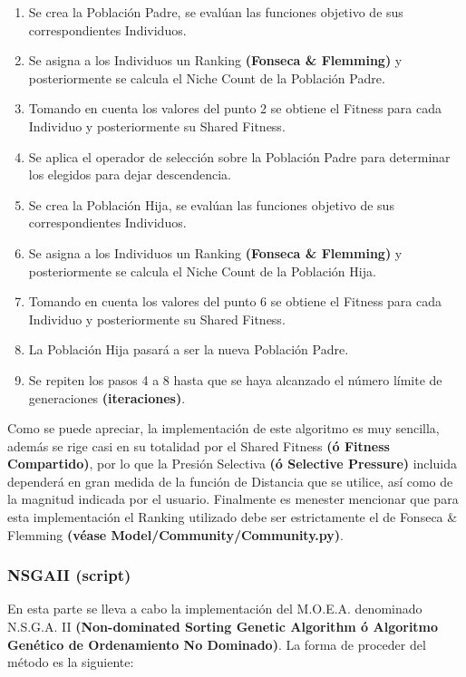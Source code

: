 \documentclass[class=report, crop=false]{standalone}
\begin{document}
\begin{enumerate} 
\item Se crea la Población Padre, se evalúan las funciones objetivo de sus correspondientes Individuos.
\item Se asigna a los Individuos un Ranking \textbf{(Fonseca \& Flemming)} y posteriormente se calcula el Niche Count de la Población Padre.
\item Tomando en cuenta los valores del punto 2 se obtiene el Fitness para cada Individuo y posteriormente su Shared Fitness.
\item Se aplica el operador de selección sobre la Población Padre para determinar los elegidos para dejar descendencia.
\item Se crea la Población Hija, se evalúan las funciones objetivo de sus correspondientes Individuos.
\item Se asigna a los Individuos un Ranking \textbf{(Fonseca \& Flemming)} y posteriormente se calcula el Niche Count de la Población Hija.
\item Tomando en cuenta los valores del punto 6 se obtiene el Fitness para cada Individuo y posteriormente su Shared Fitness.
\item La Población Hija pasará a ser la nueva Población Padre.
\item Se repiten los pasos 4 a 8 hasta que se haya alcanzado el número límite de generaciones \textbf{(iteraciones)}.
\end{enumerate}

Como se puede apreciar, la implementación de este algoritmo es 
muy sencilla, además se rige casi en su totalidad por el 
Shared Fitness \textbf{(ó Fitness Compartido)}, por lo que 
la Presión Selectiva \textbf{(ó Selective Pressure)} incluida 
dependerá en gran medida de la función de Distancia que se utilice, 
así como de la magnitud indicada por el usuario.\medskip\break
Finalmente es menester mencionar que para esta implementación el 
Ranking utilizado debe ser estrictamente el de Fonseca \& Flemming 
\textbf{(véase Model/Community/Community.py)}.

\subsubsection{NSGAII (script)}
\label{sec:a_2_6_4}
En esta parte se lleva a cabo la implementación del M.O.E.A. 
denominado N.S.G.A. II \textbf{(Non-dominated Sorting Genetic Algorithm ó Algoritmo Genético de Ordenamiento No Dominado)}.\break
La forma de proceder del método es la siguiente:
\end{document}
